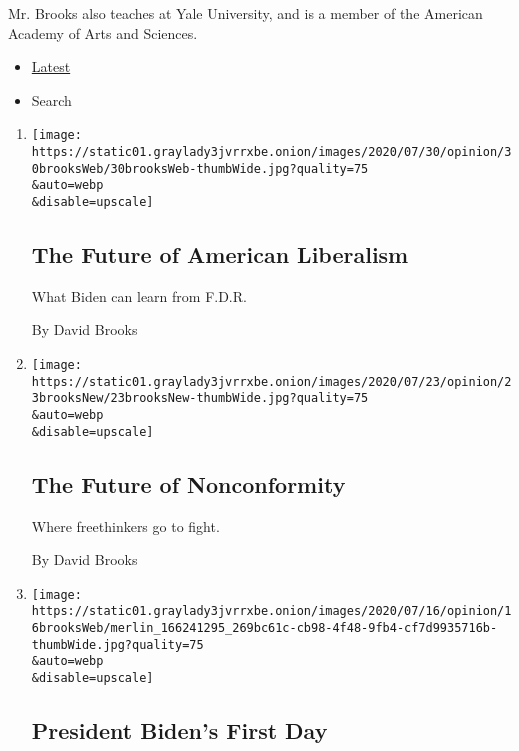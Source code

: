 Mr. Brooks also teaches at Yale University, and is a member of the
American Academy of Arts and Sciences.

\begin{itemize}
\tightlist
\item
  \protect\hyperlink{stream-panel}{Latest}
\item
  Search
\end{itemize}

\begin{enumerate}
\def\labelenumi{\arabic{enumi}.}
\item
  \href{/2020/07/30/opinion/biden-fdr.html}{}

  \texttt{[image: https://static01.graylady3jvrrxbe.onion/images/2020/07/30/opinion/30brooksWeb/30brooksWeb-thumbWide.jpg?quality=75\\\&auto=webp\\\&disable=upscale]}

  \hypertarget{the-future-of-american-liberalism}{%
  \subsection{The Future of American
  Liberalism}\label{the-future-of-american-liberalism}}

  What Biden can learn from F.D.R.

  By David Brooks
\item
  \href{/2020/07/23/opinion/substack-newsletters-writers.html}{}

  \texttt{[image: https://static01.graylady3jvrrxbe.onion/images/2020/07/23/opinion/23brooksNew/23brooksNew-thumbWide.jpg?quality=75\\\&auto=webp\\\&disable=upscale]}

  \hypertarget{the-future-of-nonconformity}{%
  \subsection{The Future of
  Nonconformity}\label{the-future-of-nonconformity}}

  Where freethinkers go to fight.

  By David Brooks
\item
  \href{/2020/07/16/opinion/biden-2020.html}{}

  \texttt{[image: https://static01.graylady3jvrrxbe.onion/images/2020/07/16/opinion/16brooksWeb/merlin\_166241295\_269bc61c-cb98-4f48-9fb4-cf7d9935716b-thumbWide.jpg?quality=75\\\&auto=webp\\\&disable=upscale]}

  \hypertarget{president-bidens-first-day}{%
  \subsection{President Biden's First
  Day}\label{president-bidens-first-day}}


\end{enumerate}
